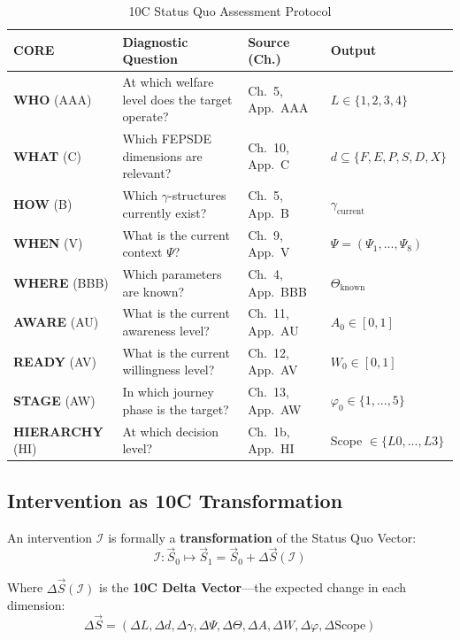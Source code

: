 \begin{table}[htbp]
\centering
\caption{10C Status Quo Assessment Protocol}
\label{tab:hhh-9c-assessment}
\renewcommand{\arraystretch}{1.4}
\footnotesize
\begin{tabular}{@{}llll@{}}
\toprule
\textbf{CORE} & \textbf{Diagnostic Question} & \textbf{Source (Ch.)} & \textbf{Output} \\
\midrule
\textbf{WHO} (AAA) & At which welfare level does the target operate? & Ch.\ 5, App.\ AAA & $L \in \{1,2,3,4\}$ \\
\textbf{WHAT} (C) & Which FEPSDE dimensions are relevant? & Ch.\ 10, App.\ C & $d \subseteq \{F,E,P,S,D,X\}$ \\
\textbf{HOW} (B) & Which $\gamma$-structures currently exist? & Ch.\ 5, App.\ B & $\gamma_{\text{current}}$ \\
\textbf{WHEN} (V) & What is the current context $\Psi$? & Ch.\ 9, App.\ V & $\Psi = (\Psi_1, ..., \Psi_8)$ \\
\textbf{WHERE} (BBB) & Which parameters are known? & Ch.\ 4, App.\ BBB & $\Theta_{\text{known}}$ \\
\textbf{AWARE} (AU) & What is the current awareness level? & Ch.\ 11, App.\ AU & $A_0 \in [0,1]$ \\
\textbf{READY} (AV) & What is the current willingness level? & Ch.\ 12, App.\ AV & $W_0 \in [0,1]$ \\
\textbf{STAGE} (AW) & In which journey phase is the target? & Ch.\ 13, App.\ AW & $\varphi_0 \in \{1,...,5\}$ \\
\textbf{HIERARCHY} (HI) & At which decision level? & Ch.\ 1b, App.\ HI & Scope $\in \{L0,...,L3\}$ \\
\bottomrule
\end{tabular}
\end{table}

\subsection{Intervention as 10C Transformation}

\begin{tcolorbox}[colback=green!5!white, colframe=green!75!black,
    title=\textbf{Theorem HHH-T0: Intervention as 10C Transformation}]

An intervention $\mathcal{I}$ is formally a \textbf{transformation} of the Status Quo Vector:
\begin{equation}
\boxed{\mathcal{I}: \vec{S}_0 \mapsto \vec{S}_1 = \vec{S}_0 + \Delta\vec{S}(\mathcal{I})}
\label{eq:hhh-intervention-transform}
\end{equation}

Where $\Delta\vec{S}(\mathcal{I})$ is the \textbf{10C Delta Vector}---the expected change in each dimension:
\begin{equation}
\Delta\vec{S} = (\Delta L, \Delta d, \Delta\gamma, \Delta\Psi, \Delta\Theta, \Delta A, \Delta W, \Delta\varphi, \Delta\text{Scope})
\end{equation}
\end{tcolorbox}

